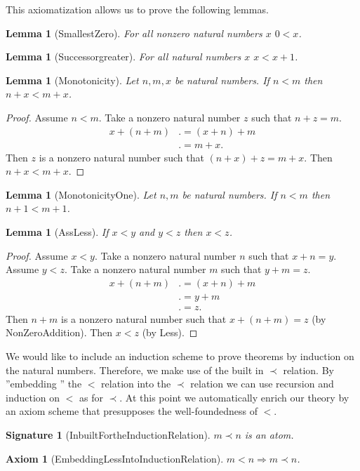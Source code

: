 \documentclass[10pt]{article}
\newenvironment{forthel}{\begin{leftbar}}{\end{leftbar}}
\theoremstyle{definition}
\theoremstyle{plain}
\newtheorem{signature}[theorem]{Signature}
\newtheorem{lemma}[theorem]{Lemma}
\newtheorem{axiom}[theorem]{Axiom}
\theoremstyle{remark}
\begin{document}
This axiomatization allows us to prove the following lemmas.
\begin{forthel}
	\begin{lemma}[SmallestZero]
		For all nonzero natural numbers $x$ $0<x$.
	\end{lemma}
	\begin{lemma}[Successorgreater]
		For all natural numbers $x$ $x<x+1$.
	\end{lemma}
	\begin{lemma}[Monotonicity]
		Let $n,m,x$ be natural numbers. If $n<m$ then $n+x < m+x$.
	\end{lemma}
	\begin{proof}
			Assume $n < m$.
			Take a nonzero natural number $z$ such that $n+z=m$.
			\begin{align*}
				x + (n+m) &.= (x+n)+m \tag*{AssAdd, ComAdd} \\
					  &.= m+x.
			\end{align*}
			Then $z$ is a nonzero natural number such that $(n+x)+z=m+x$.
			Then $n+x < m+x$.
	\end{proof}
	\begin{lemma}[MonotonicityOne]
		Let $n,m$ be natural numbers. If $n<m$ then $n+1<m+1$.
	\end{lemma}
	\begin{lemma}[AssLess]
		If $x<y$ and $y<z$ then $x<z$.
	\end{lemma}
	\begin{proof}
		Assume $x<y$. Take a nonzero natural number $n$ such that $x+n=y$. Assume $y<z$. Take a nonzero natural number $m$ such that $y+m=z$.
		\begin{align*}
			x+(n+m)&.=(x+n)+m \tag*{AssAdd}\\
			       &.=y+m\\
			       &.=z.
		\end{align*}
		Then $n+m$ is a nonzero natural number such that $x+(n+m)=z$ (by NonZeroAddition). Then $x<z$ (by Less).
	\end{proof}
\end{forthel}
We would like to include an induction scheme to prove theorems by induction on the natural numbers. Therefore, we make use of the built in $\prec$ relation. By ''embedding '' the $<$ relation into the $\prec$ relation we can use recursion and induction on $<$ as for $\prec$. At this point we automatically enrich our theory by an axiom scheme that presupposes the well-foundedness of $<$.
\begin{forthel}
	\begin{signature}[InbuiltFortheInductionRelation] 
	$m \prec n$ is an atom.
	\end{signature}
	\begin{axiom}[EmbeddingLessIntoInductionRelation] 
	$m < n \Rightarrow m \prec n$.
	\end{axiom}
\end{forthel}
\end{document}
